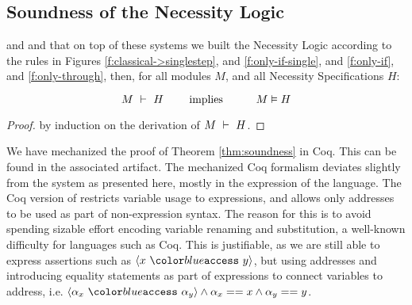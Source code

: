 \subsection{Soundness of the Necessity Logic}

\label{s:soundness}

\begin{theorem}[Soundness]
\label{thm:soundness}
 and  and that on top of these systems we built
 the Necessity Logic according to the rules in Figures  \ref{f:classical->singlestep},  and \ref{f:only-if-single}, and \ref{f:only-if},  and \ref{f:only-through},   then, for    all modules $M$, and all Necessity Specifications  $H$:
 
 $$\proves{M}{H}\ \ \ \ \ \ \ \mbox{implies}\ \ \ \ \ \  \ \ \ \satisfies{M}{H}$$
\end{theorem}

\begin{proof}
by induction on the derivation of $M\ \vdash\ H$.
\end{proof}
We have mechanized the proof of Theorem \ref{thm:soundness} in Coq. This can be found in the associated artifact. 
The mechanized Coq formalism deviates slightly from the system as
presented here,  mostly in the expression of the 
\SpecO language. The Coq version of \SpecO restricts variable usage to expressions, and allows only addresses to 
be used as part of non-expression syntax. The reason for this is to avoid spending sizable effort encoding variable
renaming and substitution, a well-known difficulty for languages such as Coq. This is justifiable, as we are still 
able to express assertions such as $\access{x}{y}$, but using addresses and introducing equality statements as part of expressions to connect
variables to address, i.e. $\access{\alpha_x}{\alpha_y} \wedge \alpha_x == x \wedge \alpha_y == y$.


